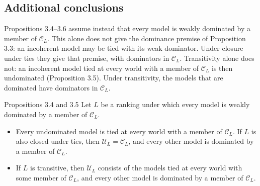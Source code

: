 \documentclass[11pt]{article}
\newcommand{\C}{\mathcal C}
\newcommand{\U}{\mathcal U}
\begin{document}
\subsection*{Additional conclusions}
Propositions 3.4--3.6 assume instead that every model is weakly dominated by a member of $\C_L$. This alone does not give the dominance premise of Proposition 3.3: an incoherent model may be tied with its weak dominator. Under closure under ties they give that premise, with dominators in $\C_L$. Transitivity alone does not: an incoherent model tied at every world with a member of $\C_L$ is then undominated (Proposition 3.5). Under transitivity, the models that are dominated have dominators in $\C_L$.

\begin{stmt}{Propositions 3.4 and 3.5}
Let $L$ be a ranking under which every model is weakly dominated by a member of $\C_L$.
\begin{itemize}[leftmargin=*]
\item[3.4] Every undominated model is tied at every world with a member of $\C_L$. If $L$ is also closed under ties, then $\U_L=\C_L$, and every other model is dominated by a member of $\C_L$.
\item[3.5] If $L$ is transitive, then $\U_L$ consists of the models tied at every world with some member of $\C_L$, and every other model is dominated by a member of $\C_L$.
\end{itemize}
\end{stmt}
\end{document}
